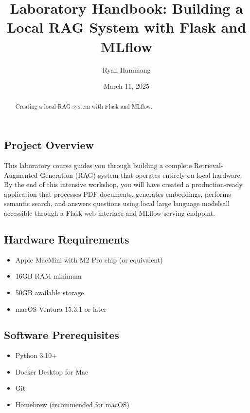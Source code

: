 \documentclass[
  screen,review,acmlarge]{acmart}
\title{Laboratory Handbook: Building a Local RAG System with Flask and MLflow}
\author{Ryan Hammang}
\date{March 11, 2025}
\providecommand{\tightlist}{%
  \setlength{\itemsep}{0pt}\setlength{\parskip}{0pt}}
\begin{document}
\begin{abstract}
Creating a local RAG system with Flask and MLflow.
\end{abstract}


\maketitle




\subsection{Project Overview}\label{project-overview}

This laboratory course guides you through building a complete Retrieval-Augmented Generation (RAG) system that operates entirely on local hardware. By the end of this intensive workshop, you will have created a production-ready application that processes PDF documents, generates embeddings, performs semantic search, and answers questions using local large language modelsall accessible through a Flask web interface and MLflow serving endpoint.

\subsection{Hardware Requirements}\label{hardware-requirements}

\begin{itemize}
\tightlist
\item
  Apple MacMini with M2 Pro chip (or equivalent)
\item
  16GB RAM minimum
\item
  50GB available storage
\item
  macOS Ventura 15.3.1 or later
\end{itemize}

\subsection{Software Prerequisites}\label{software-prerequisites}

\begin{itemize}
\tightlist
\item
  Python 3.10+
\item
  Docker Desktop for Mac
\item
  Git
\item
  Homebrew (recommended for macOS)
\end{itemize}
\end{document}
